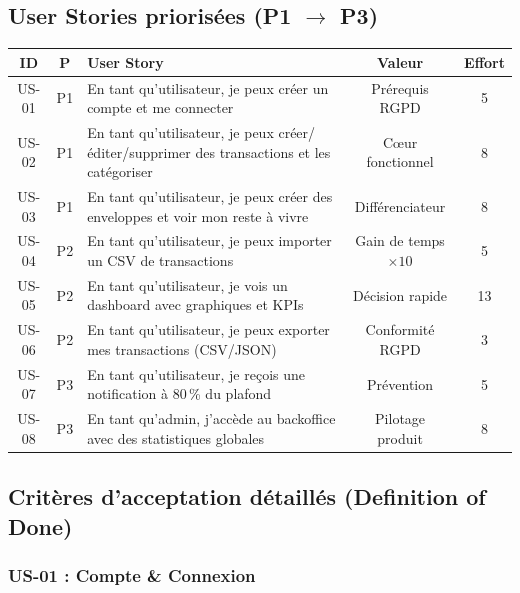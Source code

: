 \subsection{User Stories priorisées (P1 $\rightarrow$ P3)}

\begin{center}
\small
\begin{tabular}{|c|c|p{6cm}|c|c|}
\hline
\textbf{ID} & \textbf{P} & \textbf{User Story} & \textbf{Valeur} & \textbf{Effort} \\
\hline
US-01 & P1 & En tant qu'utilisateur, je peux créer un compte et me connecter & Prérequis RGPD & 5 \\
\hline
US-02 & P1 & En tant qu'utilisateur, je peux créer/éditer/supprimer des transactions et les catégoriser & Cœur fonctionnel & 8 \\
\hline
US-03 & P1 & En tant qu'utilisateur, je peux créer des enveloppes et voir mon reste à vivre & Différenciateur & 8 \\
\hline
US-04 & P2 & En tant qu'utilisateur, je peux importer un CSV de transactions & Gain de temps $\times 10$ & 5 \\
\hline
US-05 & P2 & En tant qu'utilisateur, je vois un dashboard avec graphiques et KPIs & Décision rapide & 13 \\
\hline
US-06 & P2 & En tant qu'utilisateur, je peux exporter mes transactions (CSV/JSON) & Conformité RGPD & 3 \\
\hline
US-07 & P3 & En tant qu'utilisateur, je reçois une notification à 80\,\% du plafond & Prévention & 5 \\
\hline
US-08 & P3 & En tant qu'admin, j'accède au backoffice avec des statistiques globales & Pilotage produit & 8 \\
\hline
\end{tabular}
\end{center}

\subsection{Critères d'acceptation détaillés (Definition of Done)}

\subsubsection{US-01 : Compte \& Connexion}

